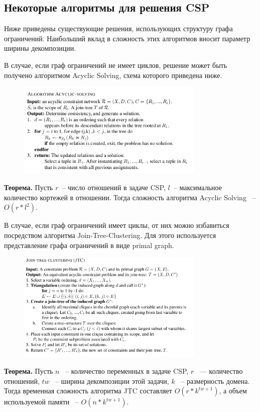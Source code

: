 \documentclass[12pt]{article}
\begin{document}
\subsection{Некоторые алгоритмы для решения CSP}
Ниже приведены существующие решения, использующих структуру графа ограничений. Наибольший вклад в сложность этих 
алгоритмов вносит параметр ширины декомпозиции.

В случае, если граф ограничений не имеет циклов, решение может быть получено алгоритмом Acyclic Solving,
схема которого приведена ниже.
\begin{figure}[htb]
\centering
\includegraphics[width=0.8\textwidth]{algo_as.png}
\label{fig:algo_acyclic}
\end{figure}

\textbf{Теорема.} Пусть $r$~-- число отношений в задаче CSP, $l$~-- максимальное количество кортежей в отношении.
Тогда сложность алгоритма Acyclic Solving ~-- $O(r*l^2)$.\cite{CSP10}

В случае, если граф ограничений имеет циклы, от них можно избавиться посредством алгоритма Join-Tree-Clustering. 
Для этого используется представление графа ограничений в виде primal graph.
\begin{figure}[htb]
\centering
\includegraphics[width=0.8\textwidth]{algo_jtc.png}
\label{fig:algo_jtc}
\end{figure}

\textbf{Теорема.} Пусть $n$ ~-- количество переменных в задаче CSP, $r$ ~--- количество отношений, $tw$ ~-- 
ширина декомпозиции этой задачи, $k$ ~-- размерность домена. 
Тогда временная сложность алгоритма JTC составляет $O(r*k^{tw+1})$, а объем используемой памяти ~-- $O(n*k^{tw+1})$.\cite{CSP10}
\end{document}

